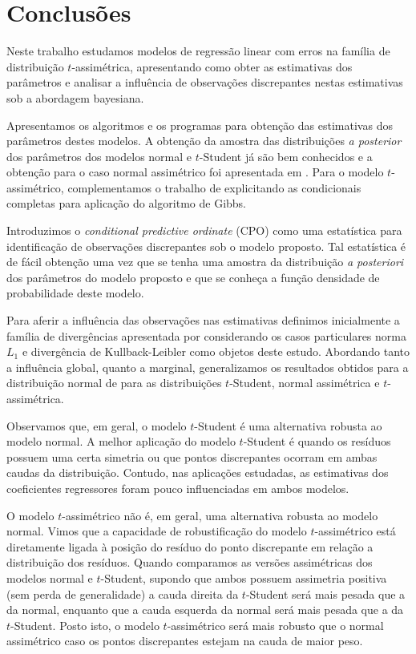 \chapter{Conclusões}
\label{cap:conclusoes}

Neste trabalho estudamos modelos de regressão linear com erros na família de distribuição $t$-assimétrica, apresentando como obter as estimativas dos parâmetros e analisar a influência de observações discrepantes nestas estimativas sob a abordagem bayesiana. 

Apresentamos os algoritmos e os programas para obtenção das estimativas dos parâmetros destes modelos. A obtenção da amostra das distribuições \textit{a posterior} dos parâmetros dos modelos normal e $t$-Student já são bem conhecidos e a obtenção para o caso normal assimétrico foi apresentada em \citet{Bayes2005:MSc}. Para o modelo $t$-assimétrico, complementamos o trabalho de \citet{Godoi2007:MSc} explicitando as condicionais completas para aplicação do algoritmo de Gibbs.

Introduzimos o \textit{conditional predictive ordinate} (CPO) como uma estatística para identificação de observações discrepantes sob o modelo proposto. Tal estatística é de fácil obtenção uma vez que se tenha uma amostra da distribuição \textit{a posteriori} dos parâmetros do modelo proposto e que se conheça a função densidade de probabilidade deste modelo.

Para aferir a influência das observações nas estimativas definimos inicialmente a família de divergências apresentada por \citet{Weiss1996} considerando os casos particulares norma $L_1$ e divergência de Kullback-Leibler como objetos deste estudo. Abordando tanto a influência global, quanto a marginal, generalizamos os resultados obtidos para a distribuição normal de \citet{WeissCho1998} para as distribuições $t$-Student, normal assimétrica e $t$-assimétrica.

Observamos que, em geral, o modelo $t$-Student é uma alternativa robusta ao modelo normal. A melhor aplicação do modelo $t$-Student é quando os resíduos possuem uma certa simetria ou que pontos discrepantes ocorram em ambas caudas da distribuição. Contudo, nas aplicações estudadas, as estimativas dos coeficientes regressores foram pouco influenciadas em ambos modelos.

O modelo $t$-assimétrico não é, em geral, uma alternativa robusta ao modelo normal. Vimos que a capacidade de robustificação do modelo $t$-assimétrico está diretamente ligada à posição do resíduo do ponto discrepante em relação a distribuição dos resíduos. Quando comparamos as versões assimétricas dos modelos normal e $t$-Student, supondo que ambos possuem assimetria positiva (sem perda de generalidade) a cauda direita da $t$-Student será mais pesada que a da normal, enquanto que a cauda esquerda da normal será mais pesada que a da $t$-Student. Posto isto, o modelo $t$-assimétrico será mais robusto que o normal assimétrico caso os pontos discrepantes estejam na cauda de maior peso.

